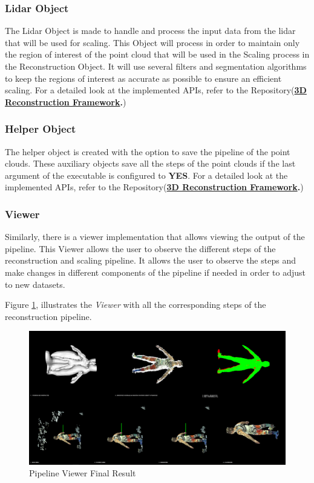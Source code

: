 \documentclass[12pt]{report}
\begin{document}
\subsubsection*{Lidar Object}
The Lidar Object is made to handle and process the input data from the lidar that will be used for scaling. 
This Object will process in order to maintain only the region of interest of the point cloud that will be used in the Scaling process in the Reconstruction Object. 
It will use several filters and segmentation algorithms to keep the regions of interest as accurate as possible to ensure an efficient scaling.
For a detailed look at the implemented APIs, refer to the Repository(\textbf{\href{https://github.com/esteban-andrade/3D-Reconstructrion-Scanner} {3D Reconstruction Framework}.})

\subsubsection*{Helper Object}
The helper object is created with the option to save the pipeline of the point clouds. These auxiliary objects save all the steps of the point clouds if the last argument of the executable is configured to \textbf{YES}.
For a detailed look at the implemented APIs, refer to the Repository(\textbf{\href{https://github.com/esteban-andrade/3D-Reconstructrion-Scanner} {3D Reconstruction Framework}.})




\subsubsection*{Viewer}
Similarly, there is a viewer implementation that allows viewing the output of the pipeline. This Viewer allows the user to observe the different steps of the reconstruction and scaling pipeline.
It allows the user to observe the steps and make changes in different components of the pipeline if needed in order to adjust to new datasets.

Figure \ref{fig:pipeline_final}, illustrates the \textit{Viewer} with all the corresponding steps of the reconstruction pipeline.

\begin{figure}[H]%
  \centering
 \includegraphics[width=1\textwidth]{pipeline.png}
\caption{Pipeline Viewer Final Result}
\label{fig:pipeline_final} 
\end{figure}
\end{document}
